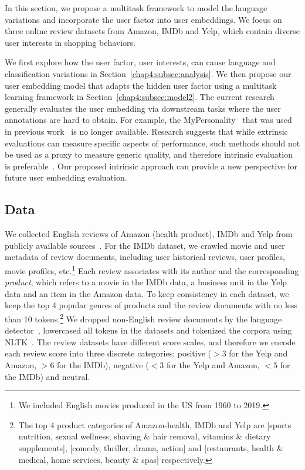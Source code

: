 In this section, we propose a multitask framework to model the language variations and incorporate the user factor into user embeddings.
We focus on three online review datasets from Amazon, IMDb and Yelp, which contain diverse user interests in shopping behaviors.

We first explore how the user factor, user interests, can cause language and classification variations in Section~\ref{chap4:subsec:analysis}.
We then propose our user embedding model that adapts the hidden user factor using a multitask learning framework in Section~\ref{chap4:subsec:model2}.
The current research~\cite{pan2019social} generally evaluates the user embedding via downstream tasks where the user annotations are hard to obtain. 
For example, the MyPersonality~\cite{kosinski2015facebook} that was used in previous work~\cite{ding2017multi, farnadi2018user, pan2019social} is no longer available. 
Research suggests that while extrinsic evaluations can measure specific aspects of performance, such methods should not be used as a proxy to measure generic quality, and therefore intrinsic evaluation is preferable~\cite{schnabel2015evaluation}.
Our proposed intrinsic approach can provide a new perspective for future user embedding evaluation.


\subsection{Data}
\label{chap4:subsec:data2}

We collected English reviews of Amazon (health product), IMDb and Yelp from publicly available sources~\cite{he2016ups, yelp_2019, imdb2020dataset}.
For the IMDb dataset, we crawled movie and user metadata of review documents, including user historical reviews, user profiles, movie profiles, etc.\footnote{We included English movies produced in the US from 1960 to 2019.}
Each review associates with its author and the corresponding \textit{product}, which refers to a movie in the IMDb data, a business unit in the Yelp data and an item in the Amazon data.
To keep consistency in each dataset, we keep the top 4 popular genres of products and the review documents with no less than 10 tokens.\footnote{The top 4 product categories of Amazon-health, IMDb and Yelp are [sports nutrition, sexual wellness, shaving \& hair removal, vitamins \& dietary supplements], [comedy, thriller, drama, action] and [restaurants, health \& medical, home services, beauty \& spas] respectively.}
We dropped non-English review documents by the language detector~\cite{lui2012langid}, lowercased all tokens in the datasets and tokenized the corpora using NLTK~\cite{bird2004nltk}.
The review datasets have different score scales, and therefore we encode each review score into three discrete categories: positive ($>3$ for the Yelp and Amazon, $>6$ for the IMDb), negative ($<3$ for the Yelp and Amazon, $<5$ for the IMDb) and neutral.



